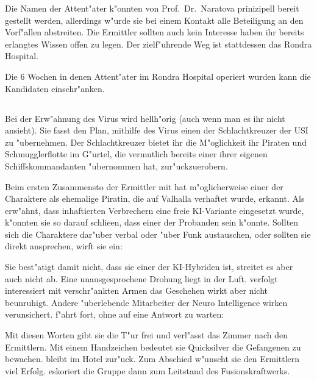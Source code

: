 \begin{remarks}
	Die Namen der Attent"ater k"onnten von Prof.~Dr.~Naratova prinizipell bereit gestellt werden, allerdings w"urde sie bei einem Kontakt alle Beteiligung an den Vorf"allen abstreiten. Die Ermittler sollten auch kein Interesse haben ihr bereits erlangtes Wissen offen zu legen. Der zielf"uhrende Weg ist stattdessen das Rondra Hospital.

	Die 6 Wochen in denen Attent"ater im Rondra Hospital operiert wurden kann die Kandidaten einschr"anken.
\end{remarks}

\subsection{\xl{}}
Bei der Erw"ahnung des Virus wird \xl{} hellh"orig (auch wenn man es ihr nicht ansieht). Sie fasst den Plan, mithilfe des Virus einen der Schlachtkreuzer der USI zu "ubernehmen. Der Schlachtkreuzer bietet ihr die M"oglichkeit ihr Piraten und Schmugglerflotte im G"urtel, die vermutlich bereits einer ihrer eigenen Schiffskommandanten "ubernommen hat, zur"uckzuerobern.

Beim ersten Zusammensto\3 der Ermittler mit \xl{} hat m"oglicherweise einer der Charaktere \xl{} als ehemalige Piratin, die auf Valhalla verhaftet wurde, erkannt. Als \ml{} erw"ahnt, dass inhaftierten Verbrechern eine freie KI-Variante eingesetzt wurde, k"onnten sie so darauf schlie\3en, dass \xl{} einer der Probanden sein k"onnte. Sollten sich die Charaktere dar"uber verbal oder "uber Funk austauschen, oder sollten sie \xl{} direkt ansprechen, wirft sie ein:


Sie best"atigt damit nicht, dass sie einer der KI-Hybriden ist, streitet es aber auch nicht ab. Eine unausgesprochene Drohung liegt in der Luft. \ml{} verfolgt interessiert mit verschr"ankten Armen das Geschehen wirkt aber nicht beunruhigt. Andere "uberlebende Mitarbeiter der Neuro Intelligence wirken verunsichert. \xl{} f"ahrt fort, ohne auf eine Antwort zu warten:


Mit diesen Worten gibt sie die T"ur frei und verl"asst das Zimmer nach den Ermittlern. Mit einem Handzeichen bedeutet sie Quicksilver die Gefangenen zu bewachen. \ml{} bleibt im Hotel zur"uck. Zum Abschied w"unscht sie den Ermittlern viel Erfolg. \xl{} eskoriert die Gruppe dann zum Leitstand des Fusionskraftwerks.

